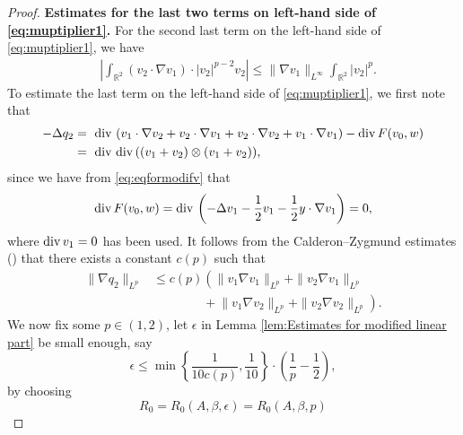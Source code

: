 \documentclass[12pt]{amsart}
\renewcommand{\div}{{\rm div \thinspace }}
\numberwithin{equation}{section}              %
\theoremstyle{remark}
\begin{document}
\begin{proof}
              \textbf{Estimates for the last two terms on left-hand side of \eqref{eq:muptiplier1}.}
			For the second last term on the left-hand side of \eqref{eq:muptiplier1}, we have
			\begin{equation}\label{eq:potentialterm}
				\begin{aligned}
					&\left|\int_{\mathbb{R}^2}	(v_2\cdot\nabla  v_1) \cdot |v_2|^{p-2}v_2\right|\leq \|\nabla  v_1\|_{L^{\infty}} \int_{\mathbb{R}^2} |v_2|^{p}.
				\end{aligned}
			\end{equation}
			To estimate the last term on the left-hand side of \eqref{eq:muptiplier1},	we first note that
			\begin{equation}
				\begin{aligned}
					-\Delta q_2 &= \textrm{ div } ( v_1\cdot \nabla v_2 + v_2\cdot \nabla  v_1 + v_2\cdot \nabla v_2 +  v_1\cdot\nabla v_1) -\div  F(v_0,w)\\
					&= \textrm{ div } \div (( v_1+v_2) \otimes( v_1+v_2) ),
				\end{aligned}
			\end{equation}
			since we have from  \eqref{eq:eqformodifv} that
			\begin{equation*}
				\div  F(v_0,w) = \div\left(-\Delta  v_1 -\frac{1}{2} v_1 -\frac{1}{2}y\cdot \nabla  v_1\right)=0,
			\end{equation*}
            where  $\div v_1=0$ has been used.
			It follows from the  Calderon–Zygmund estimates (\cite[Chapter V]{Stein93}) that there exists a constant $c(p)$ such that
			\begin{equation}\label{eq:potenest}
				\begin{aligned}
					\|\nabla q_2\|_{L^{p}}&\leq c(p)	  \left(\| v_1\nabla  v_1\|_{L^{p}}+\|v_2\nabla  v_1\|_{L^{p}}\right. \\
					&\qquad \qquad + \left. \| v_1 \nabla v_2\|_{L^{p}}+\|v_2\nabla v_2\|_{L^{p}} \right).
				\end{aligned}
			\end{equation}
			We now fix some $p\in(1,2)$,  let $\epsilon$ in Lemma \ref{lem:Estimates for modified linear part} be small enough, say
			\begin{equation*}
				\epsilon \leq \min\left\{\frac{1}{10c(p)},\frac{1}{10}\right\}
				\cdot\left(\frac{1}{p}-\frac{1}{2}\right),
			\end{equation*}
			by choosing 
			\begin{equation*}
				R_0=R_0(A,\beta, \epsilon)  =R_0(A, \beta, p) 
			\end{equation*}

\end{proof}
\end{document}
